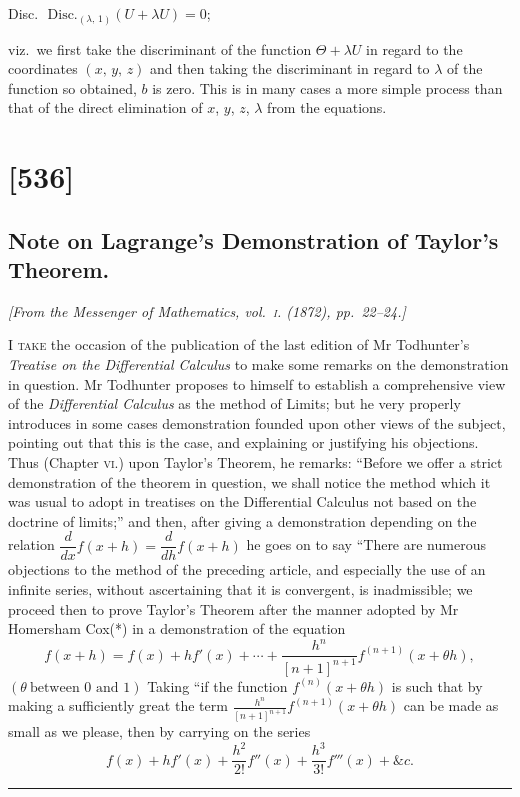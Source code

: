 \documentclass[11pt,a4paper]{book}
\begin{document}
Disc.\ $\,\text{Disc.}_{(\lambda,\,1)}(U + \lambda U) = 0$;

viz.\ we first take the discriminant of the function $\Theta + \lambda U$ in regard to the coordinates
$(x,\,y,\,z)$ and then taking the discriminant in regard to $\lambda$ of the function so obtained, $b$ is zero. This is in many cases a more simple process than that of the direct
elimination of $x$, $y$, $z$, $\lambda$ from the equations.

\clearpage

\section{[536]}
\subsection{Note on Lagrange's Demonstration of Taylor's Theorem.}

\begin{center}
\textit{[From the Messenger of Mathematics, vol.~\textsc{i}. (1872), pp.~22--24.]}
\end{center}

\noindent\textsc{I take} the occasion of the publication of the last edition of Mr Todhunter's
\textit{Treatise on the Differential Calculus} to make some remarks on the demonstration in
question. Mr Todhunter proposes to himself to establish a comprehensive view of the
\textit{Differential Calculus} as the method of Limits; but he very properly introduces in some
cases demonstration founded upon other views of the subject, pointing out that this
is the case, and explaining or justifying his objections. Thus (Chapter \textsc{vi}.) upon
Taylor's Theorem, he remarks: ``Before we offer a strict demonstration of the theorem
in question, we shall notice the method which it was usual to adopt in treatises on
the Differential Calculus not based on the doctrine of limits;'' and then, after giving
a demonstration depending on the relation $\dfrac{d}{dx}f(x + h) = \dfrac{d}{dh}f(x + h)$ he goes on to
say ``There are numerous objections to the method of the preceding article, and especially
the use of an infinite series, without ascertaining that it is convergent, is inadmissible;
we proceed then to prove Taylor's Theorem after the manner adopted by Mr Homersham
Cox(*) in a demonstration of the equation
\[
f(x + h) = f(x) + hf'(x) + \cdots + \frac{h^n}{[n+1]^{n+1}}f^{(n+1)}(x + \theta h),
\]
$(\theta\ \text{between } 0 \text{ and } 1)$ Taking ``if the function $f^{(n)}(x + \theta h)$ is such that by making a
sufficiently great the term $\frac{h^n}{[n+1]^{n+1}}f^{(n+1)}(x + \theta h)$ can be made as small as we please, then
by carrying on the series
\[
f(x) + hf'(x) + \frac{h^2}{2!}f''(x) + \frac{h^3}{3!}f'''(x) + \&c.
\]
\smallskip
\noindent\rule{0.45\textwidth}{0.4pt}
\end{document}
